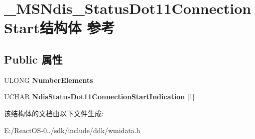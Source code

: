 \hypertarget{struct___m_s_ndis___status_dot11_connection_start}{}\section{\+\_\+\+M\+S\+Ndis\+\_\+\+Status\+Dot11\+Connection\+Start结构体 参考}
\label{struct___m_s_ndis___status_dot11_connection_start}
\subsection*{Public 属性}
\begin{DoxyCompactItemize}
\item 
\mbox{\label{struct___m_s_ndis___status_dot11_connection_start_a4a979d16eb8c6a8c9787aace0a61a56a}} 
U\+L\+O\+NG {\bfseries Number\+Elements}
\item 
\mbox{\label{struct___m_s_ndis___status_dot11_connection_start_a5e2a91fc5483edb9b05bbaed5bd7e097}} 
U\+C\+H\+AR {\bfseries Ndis\+Status\+Dot11\+Connection\+Start\+Indication} \mbox{[}1\mbox{]}
\end{DoxyCompactItemize}


该结构体的文档由以下文件生成\+:\begin{DoxyCompactItemize}
\item 
E\+:/\+React\+O\+S-\/0../sdk/include/ddk/wmidata.\+h\end{DoxyCompactItemize}
